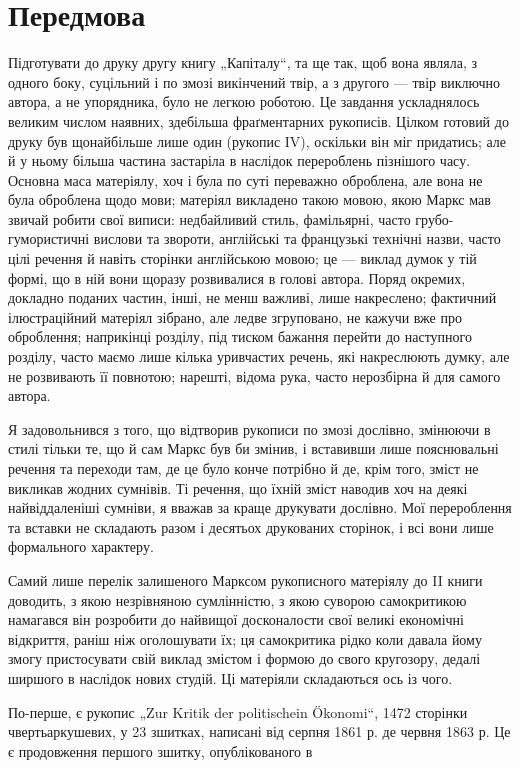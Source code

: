 \section*{Передмова}

Підготувати до друку другу книгу „Капіталу“, та ще так, щоб вона
являла, з одного боку, суцільний і по змозі викінчений твір, а з другого
— твір виключно автора, а не упорядника, було не легкою роботою.
Це завдання ускладнялось великим числом наявних, здебільша фраґментарних
рукописів. Цілком готовий до друку був щонайбільше лише один
(рукопис IV), оскільки він міг придатись; але й у ньому більша частина
застаріла в наслідок перероблень пізнішого часу. Основна маса матеріялу,
хоч і була по суті переважно оброблена, але вона не була оброблена щодо
мови; матеріял викладено такою мовою, якою Маркс мав звичай робити свої
виписи: недбайливий стиль, фамільярні, часто грубо-гумористичні вислови
та звороти, англійські та французькі технічні назви, часто цілі речення
й навіть сторінки англійською мовою; це — виклад думок у тій формі,
що в ній вони щоразу розвивалися в голові автора. Поряд окремих,
докладно поданих частин, інші, не менш важливі, лише накреслено; фактичний
ілюстраційний матеріял зібрано, але ледве згруповано, не кажучи
вже про оброблення; наприкінці розділу, під тиском бажання перейти до
наступного розділу, часто маємо лише кілька уривчастих речень, які накреслюють
думку, але не розвивають її повнотою; нарешті, відома рука,
часто нерозбірна й для самого автора.

Я задовольнився з того, що відтворив рукописи по змозі дослівно,
змінюючи в стилі тільки те, що й сам Маркс був би змінив, і вставивши
лише пояснювальні речення та переходи там, де це було конче потрібно
й де, крім того, зміст не викликав жодних сумнівів. Ті речення, що їхній
зміст наводив хоч на деякі найвіддаленіші сумніви, я вважав за краще
друкувати дослівно. Мої перероблення та вставки не складають разом і
десятьох друкованих сторінок, і всі вони лише формального характеру.

Самий лише перелік залишеного Марксом рукописного матеріялу до
II книги доводить, з якою незрівняною сумлінністю, з якою суворою
самокритикою намагався він розробити до найвищої досконалости свої
великі економічні відкриття, раніш ніж оголошувати їх; ця самокритика
рідко коли давала йому змогу пристосувати свій виклад змістом і формою
до свого кругозору, дедалі ширшого в наслідок нових студій. Ці
матеріяли складаються ось із чого.

По-перше, є рукопис „Zur Kritik der politischein Ökonomi“, 1472 сторінки
чвертьаркушевих, у 23 зшитках, написані від серпня 1861 р. де
червня 1863 р. Це є продовження першого зшитку, опублікованого в
\parbreak{}  %
